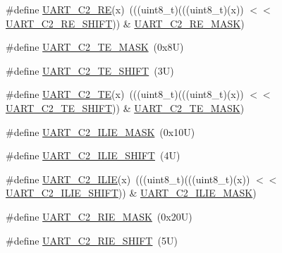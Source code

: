 \begin{DoxyCompactItemize}
\#define \mbox{\hyperlink{group___u_a_r_t___register___masks_gabc3ac11f306e028e40b72324f9ad2134}{U\+A\+R\+T\+\_\+\+C2\+\_\+\+RE}}(x)~(((uint8\+\_\+t)(((uint8\+\_\+t)(x)) $<$$<$ \mbox{\hyperlink{group___u_a_r_t___register___masks_ga65bf907ff7aaa0afeb5a3c34ff3a4b2c}{U\+A\+R\+T\+\_\+\+C2\+\_\+\+R\+E\+\_\+\+S\+H\+I\+FT}})) \& \mbox{\hyperlink{group___u_a_r_t___register___masks_ga181a8e8fd0f780d45f1bff7c76836fe5}{U\+A\+R\+T\+\_\+\+C2\+\_\+\+R\+E\+\_\+\+M\+A\+SK}})
\item 
\#define \mbox{\hyperlink{group___u_a_r_t___register___masks_ga3ac02e42b689641339aadf50ba868492}{U\+A\+R\+T\+\_\+\+C2\+\_\+\+T\+E\+\_\+\+M\+A\+SK}}~(0x8\+U)
\item 
\#define \mbox{\hyperlink{group___u_a_r_t___register___masks_ga249d6d4f12178dac9cb19afecf1b165c}{U\+A\+R\+T\+\_\+\+C2\+\_\+\+T\+E\+\_\+\+S\+H\+I\+FT}}~(3\+U)
\item 
\#define \mbox{\hyperlink{group___u_a_r_t___register___masks_ga5d3a9fe7e0515bf26c00deeb9feee1f7}{U\+A\+R\+T\+\_\+\+C2\+\_\+\+TE}}(x)~(((uint8\+\_\+t)(((uint8\+\_\+t)(x)) $<$$<$ \mbox{\hyperlink{group___u_a_r_t___register___masks_ga249d6d4f12178dac9cb19afecf1b165c}{U\+A\+R\+T\+\_\+\+C2\+\_\+\+T\+E\+\_\+\+S\+H\+I\+FT}})) \& \mbox{\hyperlink{group___u_a_r_t___register___masks_ga3ac02e42b689641339aadf50ba868492}{U\+A\+R\+T\+\_\+\+C2\+\_\+\+T\+E\+\_\+\+M\+A\+SK}})
\item 
\#define \mbox{\hyperlink{group___u_a_r_t___register___masks_ga646831f578232754b613c506d70eb282}{U\+A\+R\+T\+\_\+\+C2\+\_\+\+I\+L\+I\+E\+\_\+\+M\+A\+SK}}~(0x10\+U)
\item 
\#define \mbox{\hyperlink{group___u_a_r_t___register___masks_gaccb0ebb3f9bca9de659c4935cd895b06}{U\+A\+R\+T\+\_\+\+C2\+\_\+\+I\+L\+I\+E\+\_\+\+S\+H\+I\+FT}}~(4\+U)
\item 
\#define \mbox{\hyperlink{group___u_a_r_t___register___masks_ga474c8e26d806cf79cbddfdf496fc0364}{U\+A\+R\+T\+\_\+\+C2\+\_\+\+I\+L\+IE}}(x)~(((uint8\+\_\+t)(((uint8\+\_\+t)(x)) $<$$<$ \mbox{\hyperlink{group___u_a_r_t___register___masks_gaccb0ebb3f9bca9de659c4935cd895b06}{U\+A\+R\+T\+\_\+\+C2\+\_\+\+I\+L\+I\+E\+\_\+\+S\+H\+I\+FT}})) \& \mbox{\hyperlink{group___u_a_r_t___register___masks_ga646831f578232754b613c506d70eb282}{U\+A\+R\+T\+\_\+\+C2\+\_\+\+I\+L\+I\+E\+\_\+\+M\+A\+SK}})
\item 
\#define \mbox{\hyperlink{group___u_a_r_t___register___masks_gaa2cb31ebff38bb70191a8852eb0216aa}{U\+A\+R\+T\+\_\+\+C2\+\_\+\+R\+I\+E\+\_\+\+M\+A\+SK}}~(0x20\+U)
\item 
\#define \mbox{\hyperlink{group___u_a_r_t___register___masks_ga586c552161616eeaf685b689dde5543a}{U\+A\+R\+T\+\_\+\+C2\+\_\+\+R\+I\+E\+\_\+\+S\+H\+I\+FT}}~(5\+U)
$$
\end{DoxyCompactItemize}
